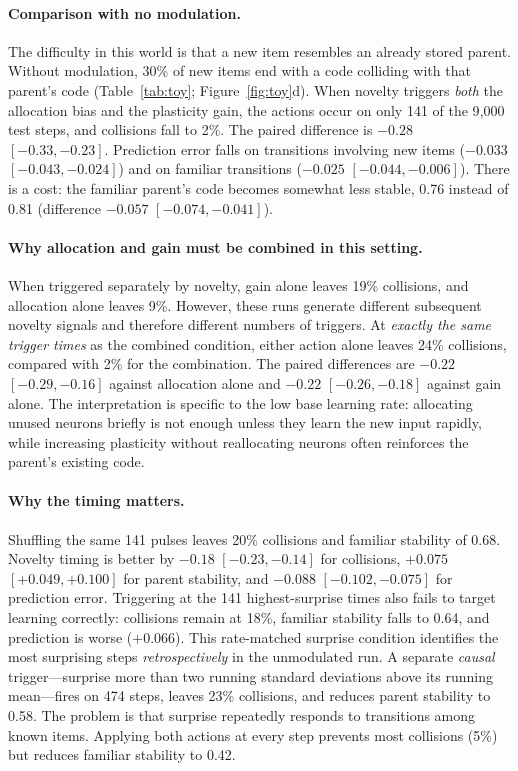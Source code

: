 \documentclass[11pt,a4paper]{article}
\begin{document}
\paragraph{Comparison with no modulation.}
The difficulty in this world is that a new item resembles an already stored parent. Without modulation, 30\% of new items end with a code colliding with that parent's code (Table~\ref{tab:toy}; Figure~\ref{fig:toy}d). When novelty triggers \emph{both} the allocation bias and the plasticity gain, the actions occur on only 141 of the 9{,}000 test steps, and collisions fall to 2\%. The paired difference is $-0.28$ $[-0.33,-0.23]$. Prediction error falls on transitions involving new items ($-0.033$ $[-0.043,-0.024]$) and on familiar transitions ($-0.025$ $[-0.044,-0.006]$). There is a cost: the familiar parent's code becomes somewhat less stable, 0.76 instead of 0.81 (difference $-0.057$ $[-0.074,-0.041]$).

\paragraph{Why allocation and gain must be combined in this setting.}
When triggered separately by novelty, gain alone leaves 19\% collisions, and allocation alone leaves 9\%. However, these runs generate different subsequent novelty signals and therefore different numbers of triggers. At \emph{exactly the same trigger times} as the combined condition, either action alone leaves 24\% collisions, compared with 2\% for the combination. The paired differences are $-0.22$ $[-0.29,-0.16]$ against allocation alone and $-0.22$ $[-0.26,-0.18]$ against gain alone. The interpretation is specific to the low base learning rate: allocating unused neurons briefly is not enough unless they learn the new input rapidly, while increasing plasticity without reallocating neurons often reinforces the parent's existing code.

\paragraph{Why the timing matters.}
Shuffling the same 141 pulses leaves 20\% collisions and familiar stability of 0.68. Novelty timing is better by $-0.18$ $[-0.23,-0.14]$ for collisions, $+0.075$ $[+0.049,+0.100]$ for parent stability, and $-0.088$ $[-0.102,-0.075]$ for prediction error. Triggering at the 141 highest-surprise times also fails to target learning correctly: collisions remain at 18\%, familiar stability falls to 0.64, and prediction is worse ($+0.066$). This rate-matched surprise condition identifies the most surprising steps \emph{retrospectively} in the unmodulated run. A separate \emph{causal} trigger---surprise more than two running standard deviations above its running mean---fires on 474 steps, leaves 23\% collisions, and reduces parent stability to 0.58. The problem is that surprise repeatedly responds to transitions among known items. Applying both actions at every step prevents most collisions (5\%) but reduces familiar stability to 0.42.
\end{document}
